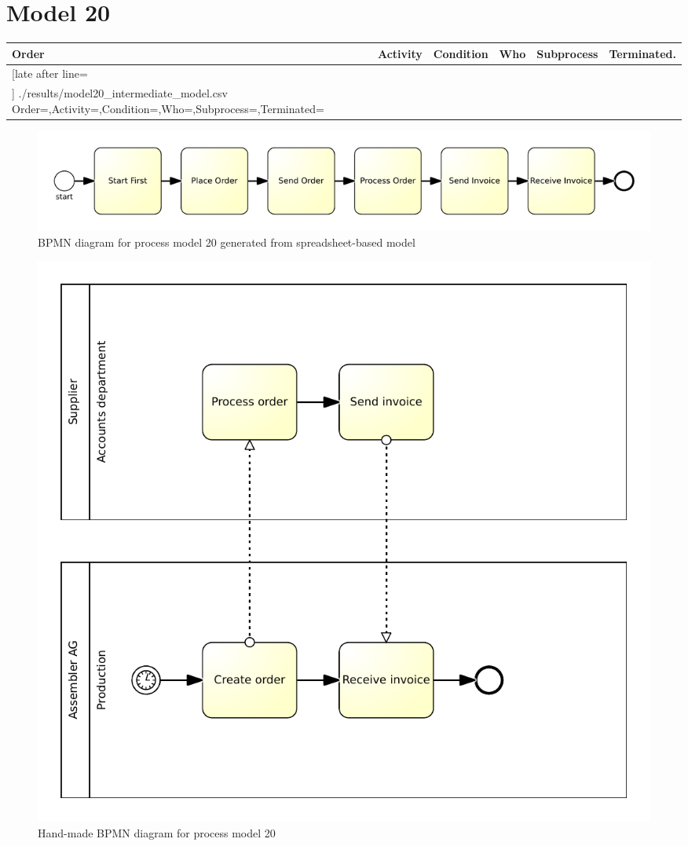 \section{Model 20}
\begin{tcolorbox}[
	breakable,
	arc=0mm,
	left=1pt,
	right = 1pt,
	boxrule=0mm,
	colback = {white},
	]
	\texttt{}
\end{tcolorbox}
\label{txt:model20}

{\scriptsize
	\begin{longtable}{|p{0.03 \hsize}|p{0.25 \hsize}|p{0.15 \hsize}|p{0.2 \hsize}|p{0.1 \hsize}|p{0.1 \hsize}|}
		\hline
		Order & Activity & Condition & Who & Subprocess & Terminated.
		\\\hline\hline
		\csvreader[late after line=\\\hline]
		{./results/model20_intermediate_model.csv}
		{Order=\Order,Activity=\Activity,Condition=\Condition,Who=\Who,Subprocess=\Subprocess,Terminated=\Terminated}
		{\Order & \Activity & \Condition & \Who & \Subprocess & \Terminated}
		\caption{Spreadsheet-based description for process model 20}
		\label{csv:model20}
	\end{longtable}
}

\begin{figure}[H]
	\centering
	\includegraphics[width=\hsize]{./generated_bpmn/model20.pdf}
	\caption{BPMN diagram for process model 20 generated from spreadsheet-based model}
	\label{bpmn:generated_model20}
\end{figure}

\begin{figure}[H]
	\centering
	\includegraphics[scale=0.7]{./bpmn/model20.pdf}
	\caption{Hand-made BPMN diagram for process model 20}
	\label{bpmn:model20}
\end{figure}

